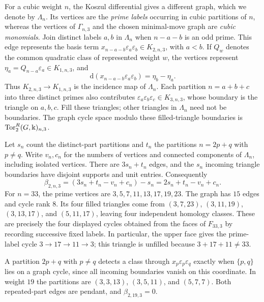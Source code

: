 For a cubic weight $n$, the Koszul differential gives a different
graph, which we denote by $\Lambda_n$. Its vertices are the
\emph{prime labels} occurring in cubic partitions of $n$, whereas
the vertices of $\Gamma_{n,3}$ and the chosen minimal-move graph are
\emph{cubic monomials}. Join distinct labels $a,b$ in $\Lambda_n$
when $n-a-b$ is an odd prime. This edge represents the basis term
$x_{n-a-b}\varepsilon_a\varepsilon_b\in K_{2,n,3}$, with $a<b$.
If $Q_w$ denotes the common quadratic class of represented weight
$w$, the vertices represent $\eta_a=Q_{n-a}\varepsilon_a\in K_{1,n,3}$,
and
\[
 \mathrm d(x_{n-a-b}\varepsilon_a\varepsilon_b)=\eta_b-\eta_a.
\]
Thus $K_{2,n,3}\to K_{1,n,3}$ is the incidence map of $\Lambda_n$.
Each partition $n=a+b+c$ into three distinct primes also contributes
$\varepsilon_a\varepsilon_b\varepsilon_c\in K_{3,n,3}$, whose boundary
is the triangle on $a,b,c$. Fill these triangles; other triangles
in $\Lambda_n$ need not be boundaries. The graph cycle space modulo
these filled-triangle boundaries is $\operatorname{Tor}_2^R(G,\Bbbk)_{n,3}$.

Let $s_n$ count the distinct-part partitions and $t_n$ the partitions
$n=2p+q$ with $p\ne q$. Write $v_n,c_n$ for the numbers of vertices
and connected components of $\Lambda_n$, including isolated vertices.
There are $3s_n+t_n$ edges, and the $s_n$ incoming triangle boundaries
have disjoint supports and unit entries. Consequently
\[
 \beta_{2,n,3}=(3s_n+t_n-v_n+c_n)-s_n
             =2s_n+t_n-v_n+c_n.
\]
For $n=33$, the prime vertices are $3,5,7,11,13,17,19,23$.
The graph has $15$ edges and cycle rank $8$. Its four filled triangles
come from $(3,7,23)$, $(3,11,19)$, $(3,13,17)$, and $(5,11,17)$,
leaving four independent homology classes. These are precisely the
four displayed cycles obtained from the faces of $F_{33,3}$ by
recording successive fixed labels. In particular, the upper face
gives the prime-label cycle $3\to17\to11\to3$; this triangle is
unfilled because $3+17+11\ne33$.

A partition $2p+q$ with $p\ne q$ detects a class through $x_p\varepsilon_p\varepsilon_q$
exactly when $\{p,q\}$ lies on a graph cycle, since all incoming boundaries
vanish on this coordinate. In weight $19$ the partitions are $(3,3,13)$,
$(3,5,11)$, and $(5,7,7)$. Both repeated-part edges are pendant, and
$\beta_{2,19,3}=0$.

